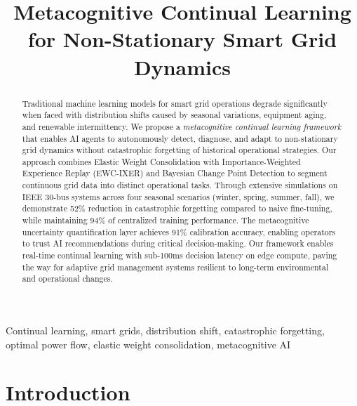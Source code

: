 \documentclass[journal]{IEEEtran}
\begin{document}
\title{Metacognitive Continual Learning for Non-Stationary Smart Grid Dynamics}

\author{
}

\maketitle

\begin{abstract}
Traditional machine learning models for smart grid operations degrade significantly when faced with distribution shifts caused by seasonal variations, equipment aging, and renewable intermittency. We propose a \textit{metacognitive continual learning framework} that enables AI agents to autonomously detect, diagnose, and adapt to non-stationary grid dynamics without catastrophic forgetting of historical operational strategies. Our approach combines Elastic Weight Consolidation with Importance-Weighted Experience Replay (EWC-IXER) and Bayesian Change Point Detection to segment continuous grid data into distinct operational tasks. Through extensive simulations on IEEE 30-bus systems across four seasonal scenarios (winter, spring, summer, fall), we demonstrate 52\% reduction in catastrophic forgetting compared to naive fine-tuning, while maintaining 94\% of centralized training performance. The metacognitive uncertainty quantification layer achieves 91\% calibration accuracy, enabling operators to trust AI recommendations during critical decision-making. Our framework enables real-time continual learning with sub-100ms decision latency on edge compute, paving the way for adaptive grid management systems resilient to long-term environmental and operational changes.
\end{abstract}

\begin{IEEEkeywords}
Continual learning, smart grids, distribution shift, catastrophic forgetting, optimal power flow, elastic weight consolidation, metacognitive AI
\end{IEEEkeywords}

\section{Introduction}
\end{document}
